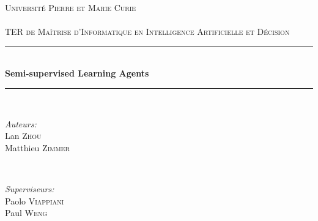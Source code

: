 \begin{titlepage}

\newcommand{\HRule}{\rule{\linewidth}{0.5mm}} %

\center %
 

\textsc{\LARGE Université Pierre et Marie Curie}\\[1.5cm] %
\textsc{\Large \titletype}\\[0.5cm] %
\textsc{\large TER de Maîtrise d’Informatique en Intelligence Artificielle et Décision}\\[0.5cm] %


\HRule \\[0.4cm]
{ \huge \bfseries Semi-supervised Learning Agents}\\[0.4cm] %
\HRule \\[1.5cm]
 
 
 
 

\begin{minipage}{0.4\textwidth}
\begin{flushleft} \large
\emph{Auteurs:}\\
Lan \textsc{Zhou}\\ %
Matthieu \textsc{Zimmer} %
\end{flushleft}
\end{minipage}
~
\begin{minipage}{0.4\textwidth}
\begin{flushright} \large
\emph{Superviseurs:} \\
Paolo \textsc{Viappiani}\\ %
Paul \textsc{Weng}\\ %
\end{flushright}
\end{minipage}\\[1cm]


\end{titlepage}
